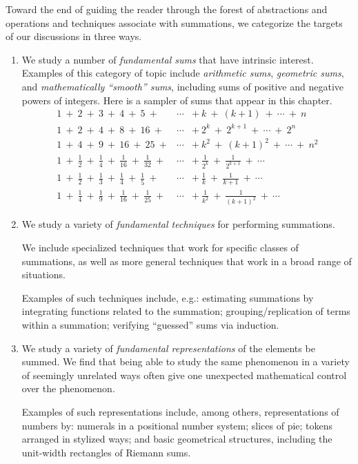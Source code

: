 Toward the end of guiding the reader through the forest of
abstractions and operations and techniques associate with summations,
we categorize the targets of our discussions in three ways.
\begin{enumerate}
\item
We study a number of {\it fundamental sums} that have intrinsic
interest.
Examples of this category of topic include {\it arithmetic sums}, {\it
  geometric sums}, and {\it mathematically ``smooth'' sums}, including
sums of positive and negative powers of integers.  Here is a sampler
of sums that appear in this chapter.
\[
\begin{array}{lcl}
1 \ + \ 2 \ + \ 3 \ + \ 4 \ + \ 5 \ + & \cdots & + \ k  \ + \ (k+1) \ +
\ \cdots \ + \ n \\
1 \ + \ 2 \ + \ 4 \ + \ 8 \ + \ 16 \ + & \cdots & + \ 2^k  \ +
\ 2^{k+1} \ + \ \cdots \ + \ 2^n \\
1 \ + \ 4 \ + \ 9 \ + \ 16 \ + \ 25 \ + & \cdots & + \ k^2  \ + \ (k+1)^2 \ +
\ \cdots \ + \ n^2 \\
1 \ + \ \frac{1}{2} \ + \ \frac{1}{4} \ + \ \frac{1}{16} \ +
\ \frac{1}{32} \ + & \cdots & + \ \frac{1}{2^k}  \ + \ \frac{1}{2^{k+1}} \ +
\ \cdots \\
1 \ + \ \frac{1}{2} \ + \ \frac{1}{3} \ + \ \frac{1}{4} \ +
\ \frac{1}{5} \ + & \cdots & + \ \frac{1}{k}  \ + \ \frac{1}{k+1} \ +
\ \cdots \\
1 \ + \ \frac{1}{4} \ + \ \frac{1}{9} \ + \ \frac{1}{16} \ +
\ \frac{1}{25} \ + & \cdots & + \ \frac{1}{k^2}  \ + \ \frac{1}{(k+1)^2} \ +
\ \cdots
\end{array}
\]

\item
We study a variety of {\it fundamental techniques} for performing
summations.

We include specialized techniques that work for specific classes of
summations, as well as more general techniques that work in a broad
range of situations.

Examples of such techniques include, e.g.: estimating summations by
integrating functions related to the summation; grouping/replication
of terms within a summation; verifying ``guessed'' sums via induction.

\item
We study a variety of {\it fundamental representations} of the
elements be summed.  We find that being able to study the same
phenomenon in a variety of seemingly unrelated ways often give one
unexpected mathematical control over the phenomenon.

Examples of such representations include, among others,
representations of numbers by: numerals in a positional number system;
slices of pie; tokens arranged in stylized ways; and basic geometrical
structures, including the unit-width rectangles of Riemann sums.
\end{enumerate}

